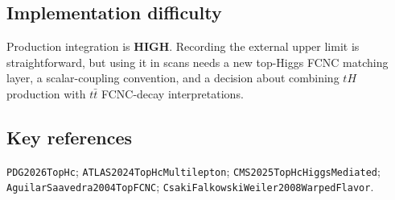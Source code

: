 \subsection*{Implementation difficulty}
Production integration is \textbf{HIGH}.  Recording the external upper limit is
straightforward, but using it in scans needs a new top-Higgs FCNC matching layer,
a scalar-coupling convention, and a decision about combining \(tH\) production
with \(t\bar t\) FCNC-decay interpretations.

\subsection*{Key references}
\texttt{PDG2026TopHc}; \texttt{ATLAS2024TopHcMultilepton};
\texttt{CMS2025TopHcHiggsMediated}; \texttt{AguilarSaavedra2004TopFCNC};
\texttt{CsakiFalkowskiWeiler2008WarpedFlavor}.
